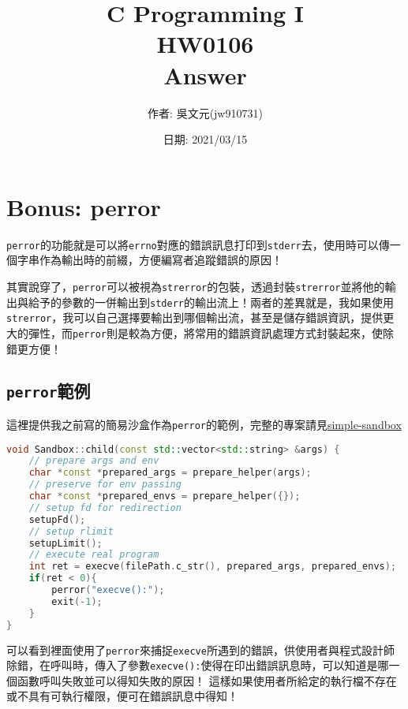 \documentclass[a4paper,10pt]{article}
\title{C Programming I\\HW0106\\Answer}
\author{作者: 吳文元(jw910731)}
\date{日期: 2021/03/15}
\begin{document}
\maketitle
\section{Bonus: perror}

\lstinline{perror}的功能就是可以將\lstinline{errno}對應的錯誤訊息打印到\lstinline{stderr}去，使用時可以傳一個字串作為輸出時的前綴，方便編寫者追蹤錯誤的原因！

其實說穿了，\lstinline{perror}可以被視為\lstinline{strerror}的包裝，透過封裝\lstinline{strerror}並將他的輸出與給予的參數的一併輸出到\lstinline{stderr}的輸出流上！兩者的差異就是，我如果使用\lstinline{strerror}，我可以自己選擇要輸出到哪個輸出流，甚至是儲存錯誤資訊，提供更大的彈性，而\lstinline{perror}則是較為方便，將常用的錯誤資訊處理方式封裝起來，使除錯更方便！

\subsection{\lstinline{perror}範例}
這裡提供我之前寫的簡易沙盒作為\lstinline{perror}的範例，完整的專案請見\href{https://github.com/jw910731/simple-sandbox}{simple-sandbox}

\begin{lstlisting}[language=c++, label={lst:perror Example}, caption={perror Example in \lstinline{src/sandbox.cpp}}, firstnumber=136]
void Sandbox::child(const std::vector<std::string> &args) {
    // prepare args and env
    char *const *prepared_args = prepare_helper(args);
    // preserve for env passing
    char *const *prepared_envs = prepare_helper({});
    // setup fd for redirection
    setupFd();
    // setup rlimit
    setupLimit();
    // execute real program
    int ret = execve(filePath.c_str(), prepared_args, prepared_envs);
    if(ret < 0){
        perror("execve():");
        exit(-1);
    }
}
\end{lstlisting}

可以看到裡面使用了\lstinline{perror}來捕捉\lstinline{execve}所遇到的錯誤，供使用者與程式設計師除錯，在呼叫時，傳入了參數\lstinline{execve():}使得在印出錯誤訊息時，可以知道是哪一個函數呼叫失敗並可以得知失敗的原因！
這樣如果使用者所給定的執行檔不存在或不具有可執行權限，便可在錯誤訊息中得知！
\end{document}
